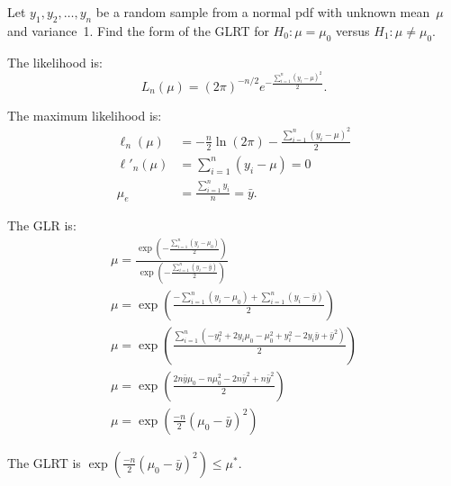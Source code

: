 \begin{problem}
    Let ${y_1,y_2,\ldots,y_n}$ be a random sample from a normal pdf with unknown mean~$\mu$ and variance~1.  Find the form of the GLRT for ${H_0: \mu = \mu_0}$ versus ${H_1: \mu \ne \mu_0}$.
\end{problem}

The likelihood is:
\begin{equation}
  L_{n}(\mu) = \left( 2 \pi \right)^{-n/2} e^{-\frac{\sum_{i=1}^{n}(y_i - \mu)^2}{2}} \text{.}
\end{equation}

The maximum likelihood is:
\begin{align}
  \ell_{n}(\mu)  &= -\frac{n}{2} \ln(2\pi) - \frac{\sum_{i=1}^{n} (y_i - \mu)^2}{2} \\
  \ell'_{n}(\mu) &=  \sum_{i=1}^{n} (y_i - \mu) = 0 \\
           \mu_e &= \frac{\sum_{i=1}^{n} y_i}{n} = \bar{y} \text{.}
\end{align}

The GLR is:
\begin{align}
  \mu = \frac{\exp\left( -\frac{\sum_{i=1}^{n} (y_i - \mu_0)}{2} \right)}{\exp\left( -\frac{\sum_{i=1}^{n} (y_i - \bar{y})}{2} \right)} \\
  \mu = \exp\left( \frac{ - \sum_{i=1}^{n} (y_i - \mu_0) + \sum_{i=1}^{n} (y_i - \bar{y})}{2} \right) \\
  \mu = \exp\left( \frac{\sum_{i=1}^{n} (-y_{i}^{2} + 2y_i \mu_0  - \mu^2_0 + y^2_i - 2y_i \bar{y}  + \bar{y}^2)}{2} \right) \\
  \mu = \exp\left( \frac{2n \bar{y} \mu_0  - n\mu^2_0 - 2n\bar{y}^2 + n\bar{y}^2}{2} \right) \\
  \mu = \exp\left(\frac{-n}{2} (\mu_0 - \bar{y})^2 \right)
\end{align}

The GLRT is ${\exp\left(\frac{-n}{2} (\mu_0 - \bar{y})^2 \right) \leq \mu^{*}}$.
